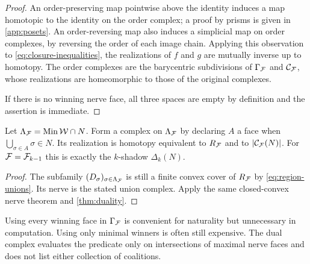 \begin{proof}
An order-preserving map pointwise above the identity induces a map homotopic to the identity on the order complex; a proof by prisms is given in \cref{app:posets}. An order-reversing map also induces a simplicial map on order complexes, by reversing the order of each image chain. Applying this observation to \cref{eq:closure-inequalities}, the realizations of $f$ and $g$ are mutually inverse up to homotopy. The order complexes are the barycentric subdivisions of $\Gamma_{\mathcal F}$ and $\mathcal C_{\mathcal F}$, whose realizations are homeomorphic to those of the original complexes.

If there is no winning nerve face, all three spaces are empty by definition and the assertion is immediate.
\end{proof}

\begin{corollary}\label{cor:minimal}
Let $\Lambda_{\mathcal F}=\operatorname{Min}\mathcal W\cap N$. Form a complex on $\Lambda_{\mathcal F}$ by declaring $A$ a face when $\bigcup_{\sigma\in A}\sigma\in N$. Its realization is homotopy equivalent to $R_{\mathcal F}$ and to $\left|\mathcal C_{\mathcal F}(N)\right|$. For $\mathcal F=\mathcal F_{k-1}$ this is exactly the $k$-shadow $\Delta_k(N)$.
\end{corollary}
\begin{proof}
The subfamily $(D_\sigma)_{\sigma\in\Lambda_{\mathcal F}}$ is still a finite convex cover of $R_{\mathcal F}$ by \cref{eq:region-unions}. Its nerve is the stated union complex. Apply the same closed-convex nerve theorem and \cref{thm:duality}.
\end{proof}

Using every winning face in $\Gamma_{\mathcal F}$ is convenient for naturality but unnecessary in computation. Using only minimal winners is often still expensive. The dual complex evaluates the predicate only on intersections of maximal nerve faces and does not list either collection of coalitions.

